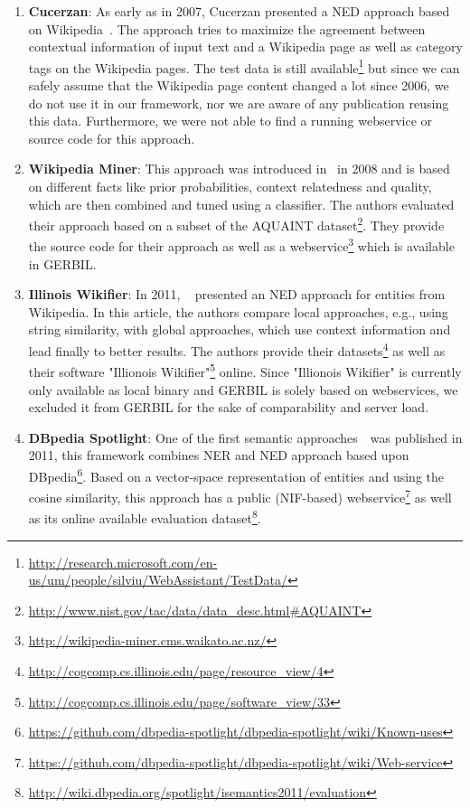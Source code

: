 \begin{enumerate}
\item \textbf{Cucerzan}: As early as in 2007, Cucerzan presented a NED approach based on Wikipedia~\cite{Cucerzan07}. The approach tries to maximize the agreement between contextual information of input text and a Wikipedia page as well as category tags on the Wikipedia pages.
The test data is still available\footnote{\url{http://research.microsoft.com/en-us/um/people/silviu/WebAssistant/TestData/}} but since we can safely assume that the Wikipedia page content changed a lot since 2006, we do not use it in our framework, nor we are aware of any publication reusing this data.
Furthermore, we were not able to find a running webservice or source code for this approach.

\item \textbf{Wikipedia Miner}: This approach was introduced in~\cite{milne2008learning} in 2008 and is based on different facts like prior probabilities, context relatedness and quality, which are then combined and tuned using a classifier.
The authors evaluated their approach based on a subset of the AQUAINT dataset\footnote{\url{http://www.nist.gov/tac/data/data_desc.html\#AQUAINT}}.
They provide the source code for their approach as well as a webservice\footnote{\url{http://wikipedia-miner.cms.waikato.ac.nz/}} which is available in GERBIL.

\item \textbf{Illinois Wikifier}: In 2011, ~\cite{rat:rot} presented an NED approach for entities from Wikipedia. 
In this article, the authors compare local approaches, e.g., using string similarity, with global approaches, which use context information and lead finally to better results.
The authors provide their datasets\footnote{\url{http://cogcomp.cs.illinois.edu/page/resource_view/4}} as well as their software "Illionois Wikifier"\footnote{\url{http://cogcomp.cs.illinois.edu/page/software_view/33}} online.
Since "Illionois Wikifier" is currently only available as local binary and GERBIL is solely based on webservices, we excluded it from GERBIL for the sake of comparability and server load.

\item \textbf{DBpedia Spotlight}: One of the first semantic approaches~\cite{spotlight}\ was published in 2011, this framework combines \ac{NER} and \ac{NED} approach based upon DBpedia\footnote{\url{https://github.com/dbpedia-spotlight/dbpedia-spotlight/wiki/Known-uses}}. 
Based on a vector-space representation of entities and using the cosine similarity, this approach has a public (NIF-based) webservice\footnote{\url{https://github.com/dbpedia-spotlight/dbpedia-spotlight/wiki/Web-service}} as well as its online available evaluation dataset\footnote{\url{http://wiki.dbpedia.org/spotlight/isemantics2011/evaluation}}.


\end{enumerate}
